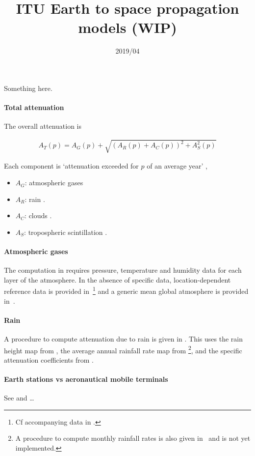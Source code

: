 \documentclass[10pt,notitlepage,oneside]{article}
\begin{document}
\title{ITU Earth to space propagation models (WIP)}
\date{2019/04 \textendash{}}
\maketitle

Something here.

\paragraph{Total attenuation}

The overall attenuation is \cite[(60)]{ITU-P.618-13}

\begin{align}
  A_T(p) = A_G(p) + \sqrt{(A_R(p) + A_C(p))^2 + A_S^2(p)}
\end{align}

Each component is ‘attenuation exceeded for $p$ of an average year’ \cite[\S2.2.2.1 Step 9]{ITU-P.618-13},

\begin{itemize}
\item $A_G$: atmospheric gases \cite[(20)]{ITU-P.676-11}
\item $A_R$: rain \cite[(8)]{ITU-P.618-13}.
\item $A_C$: clouds \cite{ITU-P.840-7}.
\item $A_S$: tropospheric scintillation \cite[(46)]{ITU-P.618-13}.
\end{itemize}

\paragraph{Atmospheric gases}

The computation in \cite[(20)]{ITU-P.676-11} requires pressure, temperature and humidity data for each layer of the atmosphere. In the absence of specific data, location-dependent reference data is provided in~\cite[Annex~2]{ITU-P.835-6}\footnote{Cf accompanying data in \cite{ITU-prop-soft}.} and a generic mean global atmosphere is provided in~\cite[Annex~1]{ITU-P.835-6}.

\paragraph{Rain} A procedure to compute attenuation due to rain is given in \cite[\S2.2.1.1]{ITU-P.618-13}. This uses the rain height map from \cite[\S2.2.1.1]{ITU-P.839-4}, the average annual rainfall rate map from \cite{ITU-P.837-7}\footnote{A procedure to compute monthly rainfall rates is also given in~\cite{ITU-P.837-7} and is not yet implemented.\todo{}}, and the specific attenuation coefficients from \cite{ITU-P.838-3}.

\cite{ITU-P.676-11}

\cite{ITU-e2s-val}

\paragraph{Earth stations vs aeronautical mobile terminals}

See \cite{ITU-P.682-3} and \cite{ITU-P.619-3}\dots

\small



\tableofcontents
\printindex

\todos
\end{document}
